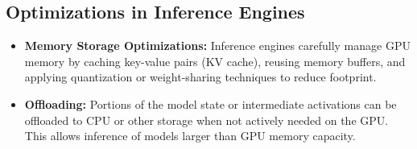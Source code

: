 \subsection{Optimizations in Inference Engines}
\begin{itemize}
    \item \textbf{Memory Storage Optimizations:}  
    Inference engines carefully manage GPU memory by caching key-value pairs (KV cache), reusing memory buffers, and applying quantization or weight-sharing techniques to reduce footprint.
    
    \item \textbf{Offloading:}  
    Portions of the model state or intermediate activations can be offloaded to CPU or other storage when not actively needed on the GPU. This allows inference of models larger than GPU memory capacity.
\end{itemize}






